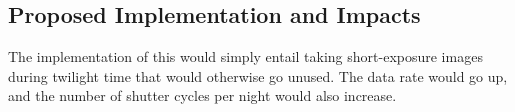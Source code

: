 \subsection{Proposed Implementation and Impacts}

The implementation of this would simply entail taking short-exposure
images during twilight time that would otherwise go unused. The data
rate would go up, and the number of shutter cycles per night would also
increase.

%
%
